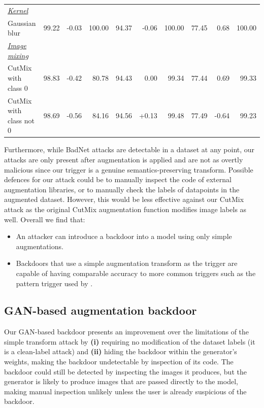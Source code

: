 \begin{table}
{\begin{tabular}{l||lr|r||lr|r||lr|r}
\hline
\;\:\underline{\textit{Kernel}}  & & & & & & & & &   \\
Gaussian blur & 99.22 & -0.03 & 100.00 & 94.37 & -0.06 & 100.00 & 77.45 & 0.68 & 100.00 \\ 
\hline
\underline{\textit{Image mixing}}  & & & & & & & & &   \\
CutMix with class $0$ & 98.83 & -0.42 & 80.78 & 94.43 & 0.00 & 99.34 & 77.44 & 0.69 & 99.33 \\
CutMix with class not $0$ & 98.69 & -0.56 & 84.16 & 94.56 & +0.13 & 99.48 & 77.49 & -0.64 & 99.23 \\
\bottomrule
\end{tabular}}
\vspace{-5pt}
\end{table}

Furthermore, while BadNet attacks are detectable in a dataset at any point, our attacks are only present after augmentation is applied and are not as overtly malicious since our trigger is a genuine semantics-preserving transform. Possible defences for our attack could be to manually inspect the code of external augmentation libraries, or to manually check the labels of datapoints in the augmented dataset. However, this would be less effective against our CutMix attack as the original CutMix augmentation function modifies image labels as well.
Overall we find that:

\begin{itemize}
  \item An attacker can introduce a backdoor into a model using only simple augmentations.
  \item Backdoors that use a simple augmentation transform as the trigger are capable of having comparable accuracy to more common triggers such as the pattern trigger used by \cite{badnet}.
\end{itemize}

\subsection{GAN-based augmentation backdoor}

Our GAN-based backdoor presents an improvement over the limitations of the simple transform attack by \textbf{(i)} requiring no modification of the dataset labels (it is a clean-label attack) and \textbf{(ii)} hiding the backdoor within the generator's weights, making the backdoor undetectable by inspection of its code. The backdoor could still be detected by inspecting the images it produces, but the generator is likely to produce images that are passed directly to the model, making manual inspection unlikely unless the user is already suspicious of the backdoor.

